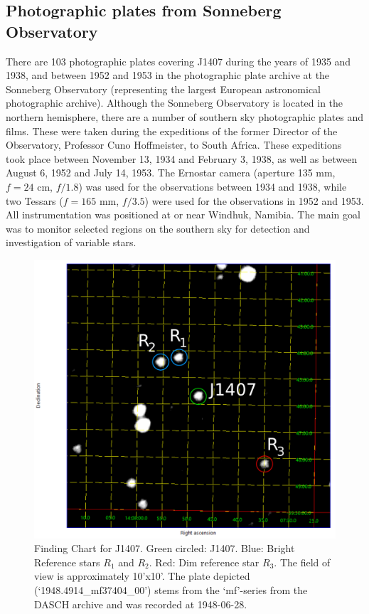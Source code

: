\documentclass[twocolumn]{aa}
\begin{document}
\subsection{Photographic plates from Sonneberg Observatory}
There are 103 photographic plates covering J1407 during the years of 1935 and 1938, and between 1952 and 1953 in the photographic plate archive at the Sonneberg Observatory (representing the largest European astronomical photographic archive).
%
Although the Sonneberg Observatory is located in the northern hemisphere, there are a number of southern sky photographic plates and films.
%
These were taken during the expeditions of the former Director of the Observatory, Professor Cuno Hoffmeister, to South Africa.
%
These expeditions took place between November 13, 1934 and February 3, 1938, as well as between August 6, 1952 and July 14, 1953.
%
The Ernostar camera (aperture 135 mm, $f = 24$ cm, $f/1.8$) was used for the observations between 1934 and 1938, while two Tessars ($f=165$ mm, $f/3.5$) were used for the observations in 1952 and 1953.
%
All instrumentation was positioned at or near Windhuk, Namibia.
%
The main goal was to monitor selected regions on the southern sky for detection and investigation of variable stars.

\begin{figure}
\centering
\includegraphics[width=1.0\linewidth]{finding_chart.pdf}
\caption{Finding Chart for J1407. Green circled: J1407. Blue: Bright Reference stars $R_1$ and $R_2$. Red: Dim reference star $R_3$. The field of view is approximately 10'x10'. The plate depicted (`1948.4914\_mf37404\_00') stems from the `mf'-series from the DASCH archive and was recorded at 1948-06-28.}
\label{fig_find_chart}
\end{figure}
\end{document}
